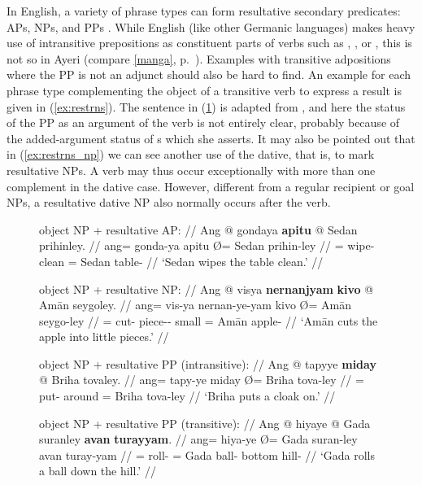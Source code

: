 In English, a variety of phrase types can form resultative secondary
predicates: APs, NPs, and PPs \parencites{simpson1983}{christie2013}. While
English (like other Germanic languages) makes heavy use of intransitive
prepositions as constituent parts of verbs such as , , or , this is not so in Ayeri (compare \autoref{manga},
p.~\pageref{manga}). Examples with transitive adpositions where the PP is not
an adjunct should also be hard to find. An example for each phrase type
complementing the object of a transitive verb to express a result is given in
(\ref{ex:restrns}). The sentence in (\ref{ex:restrns_pp2}) is adapted from
\citet{christie2013}, and here the status of the PP as an argument of the verb
is not entirely clear, probably because of the added-argument status of
\XCompl{}s which she asserts. It may also be pointed out that in 
(\ref{ex:restrns_np}) we can see another use of the dative, that is, to mark
resultative NPs. A verb may thus occur exceptionally with more than one
complement in the dative case. However, different from a regular recipient or
goal NPs, a resultative dative NP also normally occurs after the verb.

\begin{figure}
\pex\label{ex:restrns}
\a\label{ex:restrns_ap}%
	\begingl
		\glpreamble object NP + resultative AP: //
		\gla Ang @ gondaya \textbf{apitu} {} @ Sedan prihinley. //
		\glb ang= gonda-ya apitu Ø= Sedan prihin-ley //
		\glc \AgtT{}= wipe-\TsgM{} clean \Top{}= Sedan table-\PargI{} //
		\glft `Sedan wipes the table clean.' //
	\endgl

\a\label{ex:restrns_np}%
	\begingl
		\glpreamble object NP + resultative NP: //
		\gla Ang @ visya \textbf{nernanjyam} \textbf{kivo} {} @ Amān
			seygoley. //
		\glb ang= vis-ya nernan-ye-yam kivo Ø= Amān seygo-ley //
		\glc \AgtT{}= cut-\TsgM{} piece-\Pl{}-\Dat{} small \Top{}= Amān 
			apple-\PargI{} //
		\glft `Amān cuts the apple into little pieces.' //
	\endgl

\a\label{ex:restrns_pp1}%
	\begingl
		\glpreamble object NP + resultative PP (intransitive): //
		\gla Ang @ tapyye \textbf{miday} {} @ Briha tovaley. //
		\glb ang= tapy-ye miday Ø= Briha tova-ley //
		\glc \AgtT{}= put-\TsgF{} around \Top{}= Briha tova-ley //
		\glft `Briha puts a cloak on.' //
	\endgl

\a\label{ex:restrns_pp2}%
	\begingl
		\glpreamble object NP + resultative PP (transitive): //
		\gla Ang @ hiyaye {} @ Gada suranley \textbf{avan} 
			\textbf{turayyam}. //
		\glb ang= hiya-ye Ø= Gada suran-ley avan turay-yam //
		\glc \AgtT{}= roll-\TsgF{} \Top{}= Gada ball-\PargI{} bottom
			hill-\Dat{} //
		\glft `Gada rolls a ball down the hill.' //
	\endgl

\xe
\end{figure}

